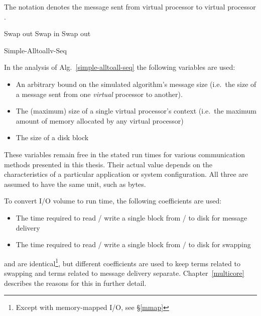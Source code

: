 \documentclass[12pt]{carletoncsthesis}
\begin{document}
The notation  denotes the message sent from virtual
processor  to virtual processor .

\begin{algorithm}[h]
\BlankLine
	Swap out\;
\BlankLine{}
\BlankLine
	Swap in\;
	Swap out\;
\BlankLine{}\BlankLine
\caption{{\sc Simple-Alltoallv-Seq}}
\label{simple-alltoall-seq}
\end{algorithm}

In the analysis of Alg.~\ref{simple-alltoall-seq} the following variables are used:
\begin{itemize}
\item[ ] An arbitrary bound on the simulated algorithm's message size
(i.e.\ the size of a message sent from one {\em virtual} processor to another).
\item[ ] The (maximum) size of a single virtual processor's context
(i.e.\ the maximum amount of memory allocated by any virtual processor)
\item[ ] The size of a disk block
\end{itemize}

These variables remain free in the stated run times for various communication
methods presented in this thesis.  Their actual value depends on the
characteristics of a particular application or system configuration.
All three are assumed to have the same unit, such as bytes.

To convert I/O volume to run time, the following coefficients are used:
\begin{itemize}
\item[ ] The time required to read / write a single block from / to disk
for message delivery
\item[ ] The time required to read / write a single block from / to disk
for swapping
\end{itemize}

 and  are identical\footnote{Except with memory-mapped I/O,
see \S\ref{mmap}}, but different coefficients are used to keep terms
related to swapping and terms related to message delivery separate.
Chapter~\ref{multicore} describes the reasons for this in further detail.
\end{document}
